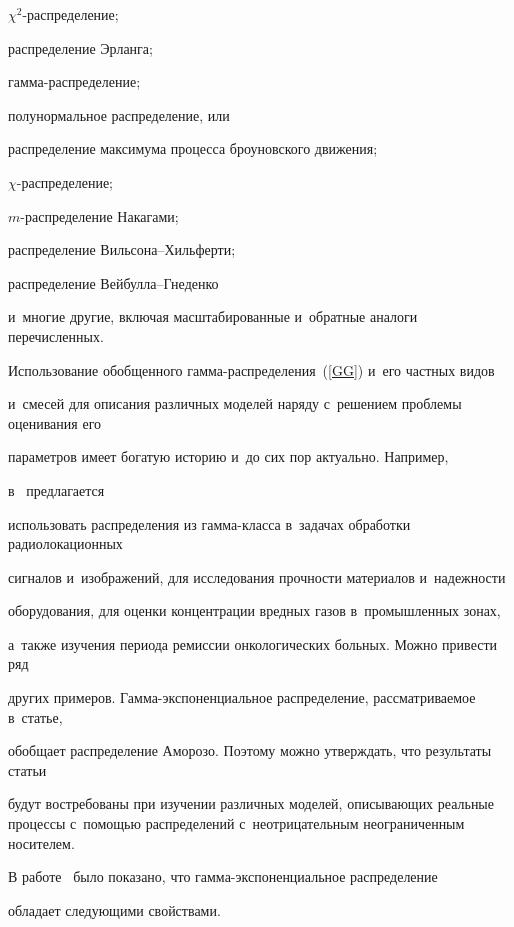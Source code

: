 $\chi^2$-рас\-пре\-де\-ле\-ние;


распределение Эрланга;


гамма-рас\-пре\-де\-ле\-ние;


полунормальное распределение, или


распределение максимума процесса броуновского движения;


$\chi$-рас\-пре\-де\-ле\-ние;


$m$-рас\-пре\-де\-ле\-ние Накагами;


распределение Виль\-со\-на--Хиль\-фер\-ти;


распределение Вей\-бул\-ла--Гне\-ден\-ко


и~многие другие, включая масштабированные и~обратные аналоги перечисленных.





Использование обобщенного гам\-ма-рас\-пре\-де\-ле\-ния~(\ref{GG}) и~его частных видов 


и~смесей для описания различных моделей наряду с~решением проблемы оценивания его 


параметров имеет богатую историю и~до сих пор актуально. Например, 


в~\cite{GaOuLuLiZh2017, ZhZh2018, IrVaGoGo2020, RiBaGaGo2020} предлагается 


использовать распределения из гам\-ма-клас\-са в~задачах обработки радиолокационных 


сигналов и~изображений, для исследования проч\-ности материалов и~надежности 


оборудования, для оценки концентрации вредных газов в~промышленных зонах, 


а~так\-же изучения периода ремиссии онкологических больных. Можно привести ряд 


других примеров. Гам\-ма-экс\-по\-нен\-ци\-аль\-ное распределение, рас\-смат\-ри\-ва\-емое в~статье, 


обобщает распределение Аморозо. Поэтому можно утверждать, что результаты статьи 


будут востребованы при изучении различных моделей, описывающих реальные процессы с~помощью распределений с~неотрицательным неограниченным носителем.





В работе~\cite{Ku2019_2} было показано, что гам\-ма-экс\-по\-нен\-ци\-аль\-ное распределение 


обладает сле\-ду\-ющи\-ми свойствами.





